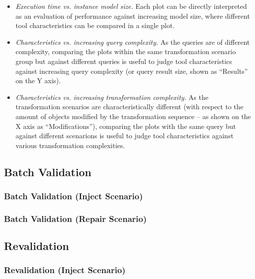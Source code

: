 \begin{itemize}
  \item \emph{Execution time vs. instance model size.} Each plot can be directly interpreted as an evaluation of performance against increasing model size, where different tool characteristics can be compared in a single plot.
  \item \emph{Characteristics vs. increasing query complexity.} As the queries are of different complexity, comparing the plots within the same transformation scenario group but against different queries is useful to judge tool characteristics against increasing query complexity (or query result size, shown as ``Results'' on the Y axis).
  \item \emph{Characteristics vs. increasing transformation complexity.} As the transformation scenarios are characteristically different (\eg with respect to the amount of objects modified by the transformation sequence -- as shown on the X axis as ``Modifications''), comparing the plots with the same query but against different scenarions is useful to judge tool characteristics against various transformation complexities.
\end{itemize}



\subsection{Batch Validation}
\label{sec:results:batchvalidation}
\subsubsection{Batch Validation (Inject Scenario)}
\subsubsection{Batch Validation (Repair Scenario)}

\subsection{Revalidation}
\label{sec:results:revalidation}
\subsubsection{Revalidation (Inject Scenario)}
